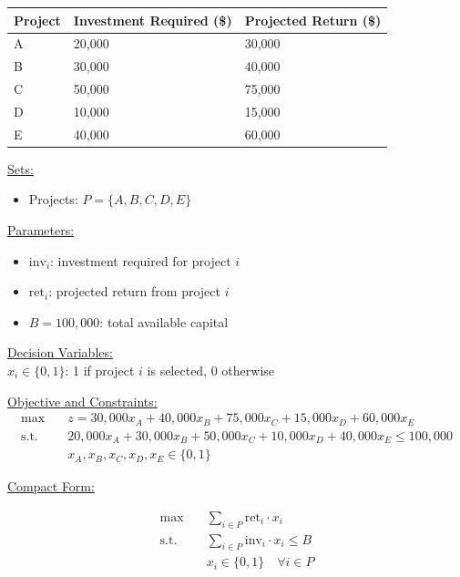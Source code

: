 \begin{table}[h!] \begin{center} \begin{tabular} {|l|l|l|} 
\hline Project & Investment Required (\$) & Projected Return (\$)  \\ \hline
\hline  A & 20,000 & 30,000  \\
\hline  B & 30,000 & 40,000  \\
\hline  C & 50,000 & 75,000  \\
\hline  D & 10,000 & 15,000  \\
\hline  E & 40,000 & 60,000  \\
\hline \end{tabular} \end{center} \end{table}


\begin{solution}

\smallskip \underline{Sets:}
\begin{itemize}
\item Projects: \( P = \{A, B, C, D, E\} \)
\end{itemize}

\smallskip \underline{Parameters:}
\begin{itemize}
\item \( \text{inv}_i \): investment required for project \( i \)
\item \( \text{ret}_i \): projected return from project \( i \)
\item \( B = 100{,}000 \): total available capital
\end{itemize}

\smallskip \underline{Decision Variables:} \\
\( x_i \in \{0,1\} \): 1 if project \( i \) is selected, 0 otherwise

\smallskip \underline{Objective and Constraints:}
\begin{align*}
\max\quad & z = 30{,}000x_A + 40{,}000x_B + 75{,}000x_C + 15{,}000x_D + 60{,}000x_E \\
\text{s.t.} \quad 
& 20{,}000x_A + 30{,}000x_B + 50{,}000x_C + 10{,}000x_D + 40{,}000x_E \le 100{,}000 \\
& x_A, x_B, x_C, x_D, x_E \in \{0,1\}
\end{align*}

\smallskip \underline{Compact Form:}

\begin{align*}
\max\quad & \sum_{i \in P} \text{ret}_i \cdot x_i \\
\text{s.t.} \quad & \sum_{i \in P} \text{inv}_i \cdot x_i \le B \\
& x_i \in \{0,1\} \quad \forall i \in P
\end{align*}


\end{solution}









